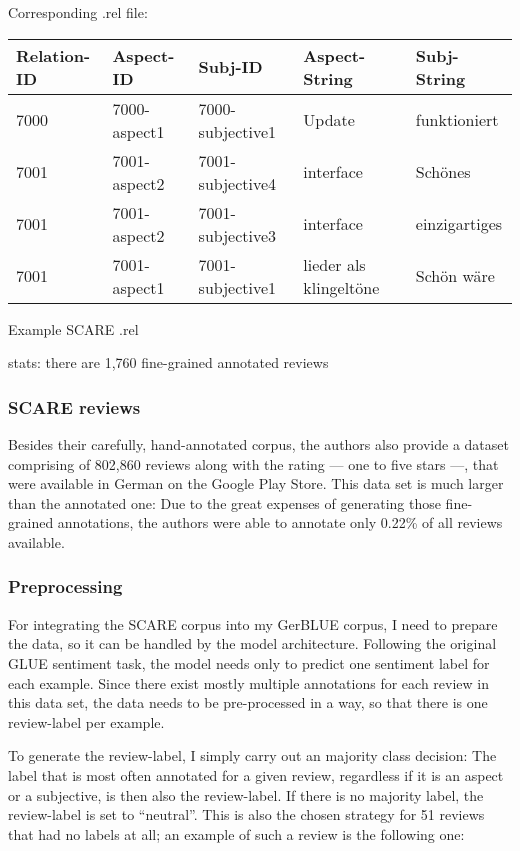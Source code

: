 Corresponding .rel file:

{\begin{tabular}{lllll}
	Relation-ID & Aspect-ID & Subj-ID & Aspect-String & Subj-String \\
	\hline
	7000 & 7000-aspect1 & 7000-subjective1 & Update & funktioniert \\
	7001 & 7001-aspect2 & 7001-subjective4 & interface & Schönes \\
	7001 & 7001-aspect2 & 7001-subjective3 & interface & einzigartiges \\
	7001 & 7001-aspect1 & 7001-subjective1 & lieder als klingeltöne & Schön wäre \\
\end{tabular}
}{Example SCARE .rel}


stats: there are 1,760 fine-grained annotated reviews

\subsubsection{SCARE reviews}

Besides their carefully, hand-annotated corpus, the authors also provide a dataset comprising of 802,860 reviews along with the rating --- one to five stars ---, that were available in German on the Google Play Store.
This data set is much larger than the annotated one: Due to the great expenses of generating those fine-grained annotations, the authors were able to annotate only 0.22\% of all reviews available.


\subsubsection{Preprocessing}

For integrating the SCARE corpus into my GerBLUE corpus, I need to prepare the data, so it can be handled by the model architecture.
Following the original GLUE sentiment task, the model needs only to predict one sentiment label for each example.
Since there exist mostly multiple annotations for each review in this data set, the data needs to be pre-processed in a way, so that there is one review-label per example.

To generate the review-label, I simply carry out an majority class decision:
The label that is most often annotated for a given review, regardless if it is an aspect or a subjective, is then also the review-label.
If there is no majority label, the review-label is set to ``neutral''.
This is also the chosen strategy for 51 reviews that had no labels at all; an example of such a review is the following one: 

